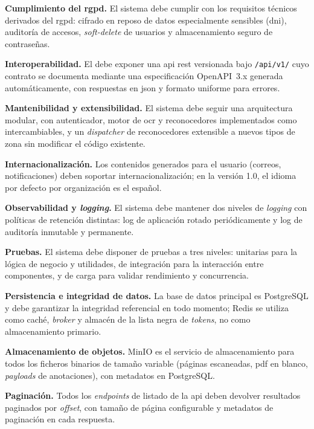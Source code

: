 \begin{nonfunctional}
  \item \textbf{Cumplimiento del \acs{rgpd}.} \label{rnf:gdpr}
  El sistema debe cumplir con los requisitos técnicos derivados del
  \acs{rgpd}: cifrado en reposo de datos especialmente sensibles
  (\acs{dni}), auditoría de accesos, \textit{soft-delete} de usuarios y
  almacenamiento seguro de contraseñas.

  \item \textbf{Interoperabilidad.} \label{rnf:interop}
  El  debe exponer una \acs{api} \acs{rest} versionada bajo
  \texttt{/api/v1/} cuyo contrato se documenta mediante una especificación
  OpenAPI~3.x generada automáticamente, con respuestas en \acs{json} y
  formato uniforme para errores.

  \item \textbf{Mantenibilidad y extensibilidad.}
  \label{rnf:maintainability}
  El sistema debe seguir una arquitectura modular, con autenticador,
  motor de \acs{ocr} y reconocedores implementados como 
  intercambiables, y un \textit{dispatcher} de reconocedores extensible a
  nuevos tipos de zona sin modificar el código existente.

  \item \textbf{Internacionalización.} \label{rnf:i18n}
  Los contenidos generados para el usuario (correos, notificaciones)
  deben soportar internacionalización; en la versión 1.0, el idioma por
  defecto por organización es el español.

  \item \textbf{Observabilidad y \textit{logging}.}
  \label{rnf:logging}
  El sistema debe mantener dos niveles de \textit{logging} con políticas
  de retención distintas: log de aplicación rotado periódicamente y log
  de auditoría inmutable y permanente.

  \item \textbf{Pruebas.} \label{rnf:testing}
  El sistema debe disponer de pruebas a tres niveles: unitarias para la
  lógica de negocio y utilidades, de integración para la interacción
  entre componentes, y de carga para validar rendimiento y concurrencia.

  \item \textbf{Persistencia e integridad de datos.}
  \label{rnf:persistence}
  La base de datos principal es PostgreSQL y debe garantizar la
  integridad referencial en todo momento; Redis se utiliza como caché,
  \textit{broker} y almacén de la lista negra de \textit{tokens}, no como
  almacenamiento primario.

  \item \textbf{Almacenamiento de objetos.}
  \label{rnf:object-storage}
  MinIO es el servicio de almacenamiento para todos los ficheros
  binarios de tamaño variable (páginas escaneadas, \acs{pdf} en blanco,
  \textit{payloads} de anotaciones), con metadatos en PostgreSQL.

  \item \textbf{Paginación.} \label{rnf:pagination}
  Todos los \textit{endpoints} de listado de la \acs{api} deben devolver
  resultados paginados por \textit{offset}, con tamaño de página
  configurable y metadatos de paginación en cada respuesta.

\end{nonfunctional}
